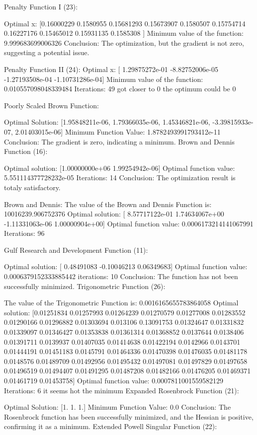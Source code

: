 \documentclass{article}
\begin{document}
Penalty Function I (23):

Optimal x: [0.16000229 0.1580955  0.15681293 0.15673907 0.1580507  0.15754714
 0.16227176 0.15465012 0.15931135 0.1585308 ]
Minimum value of the function: 9.999683699006326
Conclusion: The optimization, but the gradient is not zero, suggesting a potential issue.

Penalty Function II (24):
Optimal x: [ 1.29875272e-01 -8.82752006e-05 -1.27193508e-04 -1.10731286e-04]
Minimum value of the function: 0.010557098048339484
Iterations: 49
got closer to 0 the optimum could be 0


Poorly Scaled Brown Function:

Optimal Solution: [1.95848211e-06, 1.79366035e-06, 1.45346821e-06, -3.39815933e-07, 2.01403015e-06]
Minimum Function Value: 1.8782493991793412e-11
Conclusion: The gradient is zero, indicating a minimum.
Brown and Dennis Function (16):

Optimal solution: [1.00000000e+06 1.99254942e-06]
Optimal function value: 5.551114377728232e-05
Iterations: 14
Conclusion: The optimization result is totaly satisfactory.

Brown and Dennis:
The value of the Brown and Dennis Function is: 10016239.906752376
Optimal solution: [ 8.57717122e-01  1.74634067e+00 -1.11331063e-06  1.00000904e+00]
Optimal function value: 0.0006173214141067991
Iterations: 96


Gulf Research and Development Function (11):

Optimal solution: [ 0.48491083 -0.10046213  0.06349683]
Optimal function value: 0.0006379152333885442
iterations: 10
Conclusion: The function has not been successfully minimized.
Trigonometric Function (26):

The value of the Trigonometric Function is: 0.0016165655783864058
Optimal solution: [0.01251834 0.01257993 0.01264239 0.01270579 0.01277008 0.01283552
 0.01290166 0.01296882 0.01303694 0.013106   0.13091753 0.01324647
 0.01331832 0.01339097 0.01346427 0.01353838 0.01361314 0.01368852
 0.0137644  0.0138406  0.01391711 0.0139937  0.01407035 0.01414638
 0.01422194 0.0142966  0.0143701  0.01444191 0.01451183 0.0145791
 0.01464336 0.01470398 0.01476035 0.01481178 0.0148576  0.01489709
 0.01492956 0.01495432 0.01497081 0.01497829 0.01497658 0.01496519
 0.01494407 0.01491295 0.01487208 0.01482166 0.01476205 0.01469371
 0.01461719 0.01453758]
Optimal function value: 0.0007811001559582129
Iterations: 6
it seems hot the minimum
Expanded Rosenbrock Function (21):

Optimal Solution: [1. 1. 1.]
Minimum Function Value: 0.0
Conclusion: The Rosenbrock function has been successfully minimized, and the Hessian is positive, confirming it as a minimum.
Extended Powell Singular Function (22):
\end{document}
